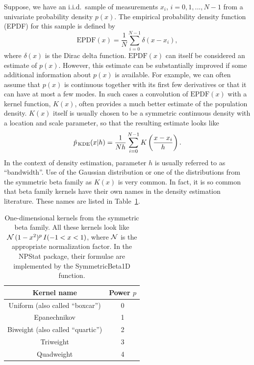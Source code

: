 \documentclass[12pt,titlepage]{article}
\newcommand{\sub}[1]{\ensuremath{_{\mbox{\scriptsize \,#1}}}}
\newcommand{\cname}[1]{\index{#1}\textsf{#1}}
\begin{document}
Suppose, we have an i.i.d.~sample of measurements $x_i$, $i = 0, 1,
..., N-1$ from a univariate probability density $p(x)$. The empirical
probability density function (EPDF) for this sample is defined by
\begin{equation}
\mbox{EPDF}(x) = \frac{1}{N} \sum_{i=0}^{N-1} \delta (x - x_i),
\label{eq:edf}
\end{equation}
where $\delta(x)$ is the Dirac delta function. $\mbox{EPDF}(x)$
can itself be considered an estimate of $p(x)$. However, this
estimate can be substantially improved if some additional information
about $p(x)$ is available. For example, we can often assume that
$p(x)$ is continuous together with its first few derivatives or
that it can have at most a few modes. In such cases a convolution
of $\mbox{EPDF}(x)$ with a kernel function, $K(x)$, often provides
a much better estimate of the population density. $K(x)$ itself is
usually chosen to be a symmetric continuous density with a location
and scale parameter, so that the resulting estimate looks
like
\begin{equation}
\hat{p}\sub{KDE}(x|h) = \frac{1}{N h} \sum_{i=0}^{N-1} K \left(\frac{x - x_i}{h}\right).
\label{eq:kde}
\end{equation}
 In the context of
density estimation, parameter $h$ is usually referred to as
``bandwidth''.
Use of the Gaussian distribution or one of the distributions from the
symmetric beta family as $K(x)$ is very common. In fact, it is so common
that beta family kernels have their own names in the density estimation
literature. These names are listed in Table~\ref{table:betakernels}.
\begin{table}[h!]
\caption{One-dimensional kernels from the symmetric beta family.
All these kernels look like
${\cal{N}} \, (1 - x^2)^p \, I(-1 < x < 1)$, where ${\cal{N}}$
is the appropriate normalization factor. In the
NPStat package, their formulae are implemented by the
\cname{SymmetricBeta1D} function.}
\label{table:betakernels}
\begin{center}
\noindent\begin{tabular}{|c|c|} \hline
Kernel name  & Power $p$ \\ \hline\hline
Uniform (also called ``boxcar'') & 0 \\ \hline
Epanechnikov & 1 \\ \hline
Biweight (also called ``quartic'') & 2 \\ \hline
Triweight & 3 \\ \hline
Quadweight & 4 \\ \hline
\end{tabular}
\end{center}
\end{table}
\end{document}
